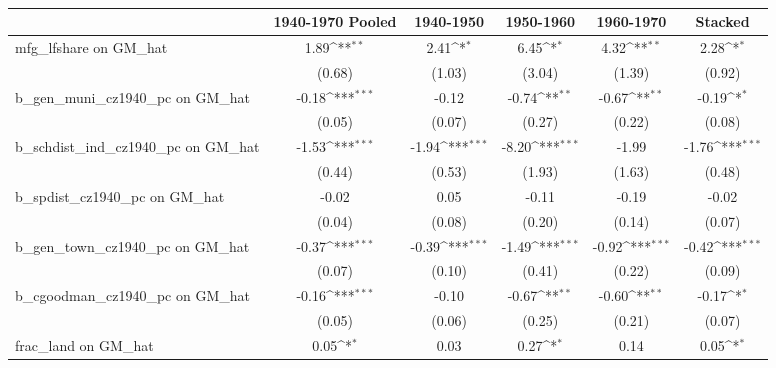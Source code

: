 \begin{table}[htbp]\centering
\def\sym#1{\ifmmode^{#1}\else\(^{#1}\)\fi}
\caption{}
\begin{tabular}{l*{5}{c}}
\toprule
                &\multicolumn{1}{c}{1940-1970 Pooled}&\multicolumn{1}{c}{1940-1950}&\multicolumn{1}{c}{1950-1960}&\multicolumn{1}{c}{1960-1970}&\multicolumn{1}{c}{Stacked}\\
\midrule
mfg\_lfshare on GM\_hat&     1.89\sym{**} &     2.41\sym{*}  &     6.45\sym{*}  &     4.32\sym{**} &     2.28\sym{*}  \\
                &   (0.68)         &   (1.03)         &   (3.04)         &   (1.39)         &   (0.92)         \\
\addlinespace
b\_gen\_muni\_cz1940\_pc on GM\_hat&    -0.18\sym{***}&    -0.12         &    -0.74\sym{**} &    -0.67\sym{**} &    -0.19\sym{*}  \\
                &   (0.05)         &   (0.07)         &   (0.27)         &   (0.22)         &   (0.08)         \\
\addlinespace
b\_schdist\_ind\_cz1940\_pc on GM\_hat&    -1.53\sym{***}&    -1.94\sym{***}&    -8.20\sym{***}&    -1.99         &    -1.76\sym{***}\\
                &   (0.44)         &   (0.53)         &   (1.93)         &   (1.63)         &   (0.48)         \\
\addlinespace
b\_spdist\_cz1940\_pc on GM\_hat&    -0.02         &     0.05         &    -0.11         &    -0.19         &    -0.02         \\
                &   (0.04)         &   (0.08)         &   (0.20)         &   (0.14)         &   (0.07)         \\
\addlinespace
b\_gen\_town\_cz1940\_pc on GM\_hat&    -0.37\sym{***}&    -0.39\sym{***}&    -1.49\sym{***}&    -0.92\sym{***}&    -0.42\sym{***}\\
                &   (0.07)         &   (0.10)         &   (0.41)         &   (0.22)         &   (0.09)         \\
\addlinespace
b\_cgoodman\_cz1940\_pc on GM\_hat&    -0.16\sym{***}&    -0.10         &    -0.67\sym{**} &    -0.60\sym{**} &    -0.17\sym{*}  \\
                &   (0.05)         &   (0.06)         &   (0.25)         &   (0.21)         &   (0.07)         \\
\addlinespace
frac\_land on GM\_hat&     0.05\sym{*}  &     0.03         &     0.27\sym{*}  &     0.14         &     0.05\sym{*}  \\

\end{tabular}
\end{table}
